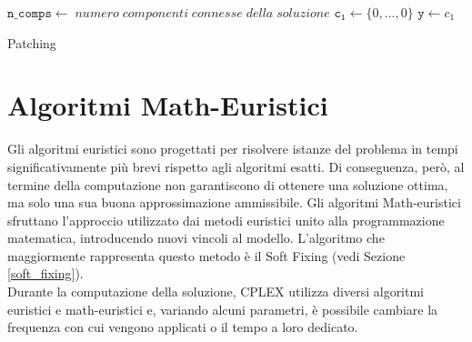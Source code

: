 \begin{algorithm}[h]
\DontPrintSemicolon
{}
\BlankLine
$\mathtt{n\_comps \gets} \;numero\; componenti\; connesse \;della\; soluzione$\;
\BlankLine
$\mathtt{c_1\gets}\{0,...,0\}$\;
\BlankLine
{}
$\mathtt{y \gets} c_1$\;
\caption{Patching}
\end{algorithm}

\section{Algoritmi Math-Euristici}
Gli algoritmi euristici sono progettati per risolvere istanze del problema in tempi significativamente più brevi rispetto agli algoritmi esatti. Di conseguenza, però, al termine della computazione non garantiscono di ottenere una soluzione ottima, ma solo una sua buona approssimazione ammissibile. Gli algoritmi Math-euristici sfruttano l'approccio utilizzato dai metodi euristici unito alla programmazione matematica, introducendo nuovi vincoli al modello. L'algoritmo che maggiormente rappresenta questo metodo è il Soft Fixing (vedi Sezione \ref{soft_fixing}). \\
Durante la computazione della soluzione, CPLEX utilizza diversi algoritmi euristici e math-euristici e, variando alcuni parametri, è possibile cambiare la frequenza con cui vengono applicati o il tempo a loro dedicato. 

